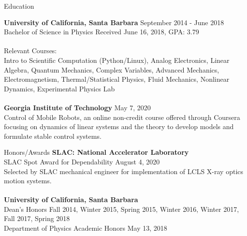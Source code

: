 \documentclass{resume} %
\begin{document}

\begin{rSection}{Education}

{\bf University of California, Santa Barbara} \hfill {September 2014 - June 2018} 
\\ Bachelor of Science in Physics \hfill {Received June 16, 2018, GPA: 3.79 } \\ \\
{Relevant Courses:}
\\ Intro to Scientific Computation (Python/Linux), Analog Electronics, Linear Algebra, Quantum Mechanics, Complex Variables, Advanced Mechanics, Electromagnetism, Thermal/Statistical Physics, Fluid Mechanics, Nonlinear Dynamics, Experimental Physics Lab \\ \\
{\bf Georgia Institute of Technology} \hfill {May 7, 2020}
\\ Control of Mobile Robots, an online non-credit course offered through Coursera focusing on dynamics of linear systems and the theory to develop models and formulate stable control systems.
\end{rSection}


\begin{rSection}{Honors/Awards}
{\bf SLAC: National Accelerator Laboratory}
\\SLAC Spot Award for Dependability \hfill {August 4, 2020 }
\\Selected by SLAC mechanical engineer for implementation of LCLS X-ray optics motion systems.\\ \\
{\bf University of California, Santa Barbara}
\\Dean’s Honors \hfill {Fall 2014, Winter 2015, Spring 2015, Winter 2016, Winter 2017, Fall 2017, Spring 2018 }
\\Department of Physics Academic Honors \hfill {May 13, 2018 }
\end{rSection}

\end{document}
